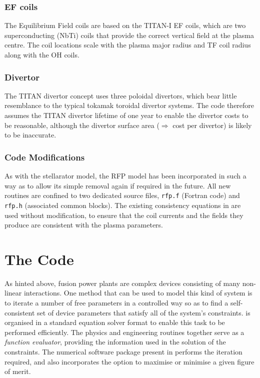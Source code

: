 {\subsubsection{EF coils}
The Equilibrium Field coils are based on the TITAN-I EF coils, which are two
superconducting (NbTi) coils that provide the correct vertical field at the
plasma centre. The coil locations scale with the plasma major radius and TF
coil radius along with the OH coils.

\subsubsection{Divertor}
The TITAN divertor concept uses three poloidal divertors, which bear little
resemblance to the typical tokamak toroidal divertor systems. The code
therefore assumes the TITAN divertor lifetime of one year to enable the
divertor costs to be reasonable, although the divertor surface area
($\Longrightarrow$ cost per divertor) is likely to be inaccurate.

\subsubsection{Code Modifications}
As with the stellarator model, the RFP model has been incorporated in such a
way as to allow its simple removal again if required in the future. All new
routines are confined to two dedicated source files, {\tt rfp.f} (Fortran
code) and {\tt rfp.h} (associated common blocks). The existing consistency
equations in \PS are used without modification, to ensure that the coil
currents and the fields they produce are consistent with the plasma
parameters.


\section{The Code}

As hinted above, fusion power plants are complex devices consisting of many
non-linear interactions. One method that can be used to model this kind of
system is to iterate a number of free parameters in a controlled way so as to
find a self-consistent set of device parameters that satisfy all of the
system's constraints. \PS is organised in a standard equation solver format to
enable this task to be performed efficiently. The physics and engineering
routines together serve as a {\it function evaluator}, providing the
information used in the solution of the constraints. The numerical software
package present in \PS performs the iteration required, and also incorporates
the option to maximise or minimise a given figure of merit.

}
